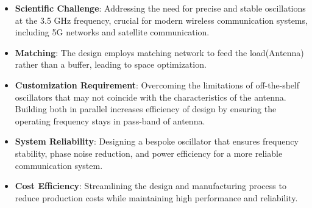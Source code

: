 
\begin{comment}
Our project set out to design, implement and fabricate an RF Oscillator, matching network and microstrip antenna on a PCB operating between 3.4 and 3.6GHz. We were centrally interested in understanding and implementing several of the main hardware building blocks found in communication systems.

\begin{enumerate}
\item Develop and validate a detailed Spice model for the selected transistor.
\item Design an oscillator circuit capable of generating the required frequency and analyze its stability, frequency accuracy, and harmonic content.
\item Design a matching network to achieve a \(50[\Omega]\) impedance match for the antenna and validate it through S-parameters analysis.
\item Develop and simulate the antenna system to be integrated into the transmitter, demonstrating efficiency and radiation patterns.
\item Fabricate the PCB according to the finalized layout, conduct comprehensive system testing, and validate performance metrics such as signal strength and reliability.
\end{enumerate}
\end{comment}

\begin{itemize}
    \item \textbf{Scientific Challenge}: Addressing the need for precise and stable oscillations at the 3.5 GHz frequency, crucial for modern wireless communication systems, including 5G networks and satellite communication.
    \item \textbf{Matching}: The design employs matching network to feed the load(Antenna) rather than a buffer, leading to space optimization.
    \item \textbf{Customization Requirement}: Overcoming the limitations of off-the-shelf oscillators that may not coincide with the characteristics of the antenna. Building both in parallel increases efficiency of design by ensuring the operating frequency stays in pass-band of antenna. 
    \item \textbf{System Reliability}: Designing a bespoke oscillator that ensures frequency stability, phase noise reduction, and power efficiency for a more reliable communication system.
    \item \textbf{Cost Efficiency}: Streamlining the design and manufacturing process to reduce production costs while maintaining high performance and reliability.
\end{itemize}